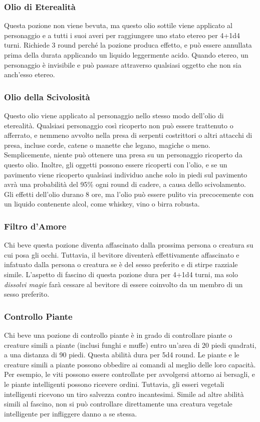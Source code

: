 \documentclass{article}
\begin{document}
\begin{multicols}{2}
\subsubsection{Olio di Eterealità}
Questa pozione non viene bevuta, ma questo olio sottile viene applicato al personaggio e a tutti i suoi averi per raggiungere uno stato etereo per 4+1d4 turni. Richiede 3 round perché la pozione produca effetto, e può essere annullata prima della durata applicando un liquido leggermente acido. Quando etereo, un personaggio è invisibile e può passare attraverso qualsiasi oggetto che non sia anch'esso etereo.

\subsubsection{Olio della Scivolosità}
Questo olio viene applicato al personaggio nello stesso modo dell'olio di eterealità. Qualsiasi personaggio così ricoperto non può essere trattenuto o afferrato, e nemmeno avvolto nella presa di serpenti costrittori o altri attacchi di presa, incluse corde, catene o manette che legano, magiche o meno. Semplicemente, niente può ottenere una presa su un personaggio ricoperto da questo olio. Inoltre, gli oggetti possono essere ricoperti con l'olio, e se un pavimento viene ricoperto qualsiasi individuo anche solo in piedi sul pavimento avrà una probabilità del 95\% ogni round di cadere, a causa dello scivolamento. Gli effetti dell'olio durano 8 ore, ma l'olio può essere pulito via precocemente con un liquido contenente alcol, come whiskey, vino o birra robusta.

\subsubsection{Filtro d'Amore}
Chi beve questa pozione diventa affascinato dalla prossima persona o creatura su cui posa gli occhi. Tuttavia, il bevitore diventerà effettivamente affascinato e infatuato dalla persona o creatura se è del sesso preferito e di stirpe razziale simile. L'aspetto di fascino di questa pozione dura per 4+1d4 turni, ma solo \textit{dissolvi magie} farà cessare al bevitore di essere coinvolto da un membro di un sesso preferito.

\subsubsection{Controllo Piante}
Chi beve una pozione di controllo piante è in grado di controllare piante o creature simili a piante (inclusi funghi e muffe) entro un'area di 20 piedi quadrati, a una distanza di 90 piedi. Questa abilità dura per 5d4 round. Le piante e le creature simili a piante possono obbedire ai comandi al meglio delle loro capacità. Per esempio, le viti possono essere controllate per avvolgersi attorno ai bersagli, e le piante intelligenti possono ricevere ordini. Tuttavia, gli esseri vegetali intelligenti ricevono un tiro salvezza contro incantesimi. Simile ad altre abilità simili al fascino, non si può controllare direttamente una creatura vegetale intelligente per infliggere danno a se stessa.


\end{multicols}
\end{document}
